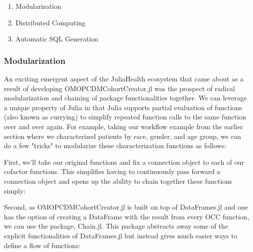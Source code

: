 \documentclass{juliacon}
\begin{document}
\begin{enumerate}

\item Modularization

\item Distributed Computing

\item Automatic SQL Generation

\end{enumerate}

\subsubsection{Modularization}

An exciting emergent aspect of the JuliaHealth ecosystem that came about as a result of developing OMOPCDMCohortCreator.jl was the prospect of radical modularization and chaining of package functionalities together.
We can leverage a unique property of Julia in that Julia supports partial evaluation of functions (also known as currying) to simplify repeated function calls to the same function over and over again.
For example, taking our workflow example from the earlier section where we characterized patients by race, gender, and age group, we can do a few "tricks" to modularize these characterization functions as follows:

First, we'll take our original functions and fix a connection object to each of our cofactor functions.
This simplifies having to continuously pass forward a connection object and opens up the ability to chain together these functions simply:

Second, as OMOPCDMCohortCreator.jl is built on top of DataFrames.jl and one has the option of creating a DataFrame with the result from every OCC function, we can use the package, Chain.jl.
This package abstracts away some of the explicit functionalities of DataFrames.jl but instead gives much easier ways to define a flow of functions:
\end{document}
